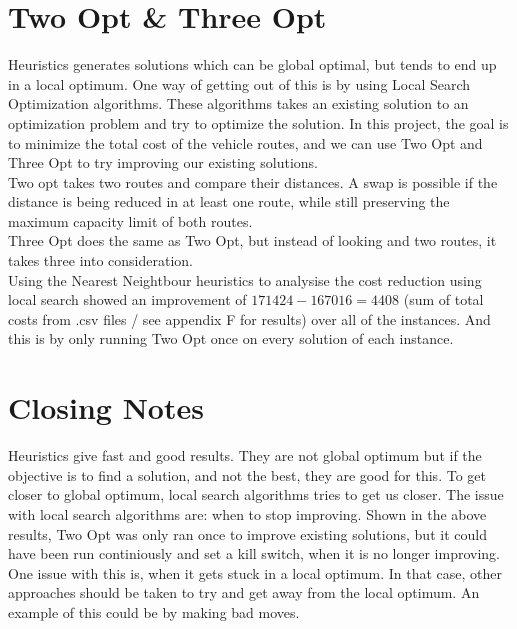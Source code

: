 \documentclass[12pt]{article}
\begin{document}
\section{Two Opt \& Three Opt}

Heuristics generates solutions which can be global optimal, but tends to end up in a local optimum. One way of getting out of this is by using Local Search Optimization algorithms. These algorithms takes an existing solution to an optimization problem and try to optimize the solution. In this project, the goal is to minimize the total cost of the vehicle routes, and we can use Two Opt and Three Opt to try improving our existing solutions. \\
Two opt takes two routes and compare their distances. A swap is possible if the distance is being reduced in at least one route, while still preserving the maximum capacity limit of both routes. \\
Three Opt does the same as Two Opt, but instead of looking and two routes, it takes three into consideration. \\

Using the Nearest Neightbour heuristics to analysise the cost reduction using local search showed an improvement of $171424 - 167016 = 4408$ (sum of total costs from .csv files / see appendix F for results) over all of the instances. And this is by only running Two Opt once on every solution of each instance.

\section{Closing Notes}

Heuristics give fast and good results. They are not global optimum but if the objective is to find a solution, and not the best, they are good for this. To get closer to global optimum, local search algorithms tries to get us closer. The issue with local search algorithms are: when to stop improving. Shown in the above results, Two Opt was only ran once to improve existing solutions, but it could have been run continiously and set a kill switch, when it is no longer improving. One issue with this is, when it gets stuck in a local optimum. In that case, other approaches should be taken to try and get away from the local optimum. An example of this could be by making bad moves. 
\end{document}
